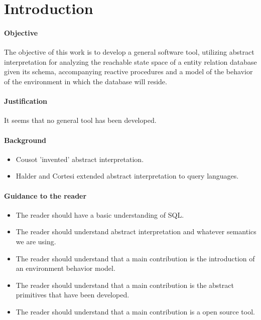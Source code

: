 
\section{Introduction}\label{sec:introduction}


\paragraph{Objective}

The objective of this work is to develop a general software tool, utilizing abstract interpretation for analyzing the reachable state space of a entity relation database given its schema, accompanying reactive procedures and a model of the behavior of the environment in which the database will reside.


\paragraph{Justification}

It seems that no general tool has been developed.

\paragraph{Background}

\begin{itemize}
    \item Cousot 'invented' abstract interpretation.
    \item Halder and Cortesi extended abstract interpretation to query languages.
\end{itemize}

\paragraph{Guidance to the reader}

\begin{itemize}
    \item The reader should have a basic understanding of SQL.
    \item The reader should understand abstract interpretation and whatever semantics we are using.
    \item The reader should understand that a main contribution is the introduction of an environment behavior model.
    \item The reader should understand that a main contribution is the abstract primitives that have been developed.
    \item The reader should understand that a main contribution is a open source tool.
\end{itemize}

